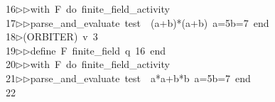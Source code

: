 \begin{tabbing}
16\>$\triangleright$\>$\triangleright$\>with\ F\ do\ finite\_field\_activity\ \\[0pt]
17\>$\triangleright$\>$\triangleright$\>parse\_and\_evaluate\ test\ \ (a+b)*(a+b)\ a=5b=7\ end\\[0pt]
18\>$\triangleright$\>(ORBITER)\ v\ 3\ \\[0pt]
19\>$\triangleright$\>$\triangleright$\>define\ F\ finite\_field\ q\ 16\ end\ \\[0pt]
20\>$\triangleright$\>$\triangleright$\>with\ F\ do\ finite\_field\_activity\ \\[0pt]
21\>$\triangleright$\>$\triangleright$\>parse\_and\_evaluate\ test\ \ a*a+b*b\ a=5b=7\ end\\[0pt]
22\>\end{tabbing}
